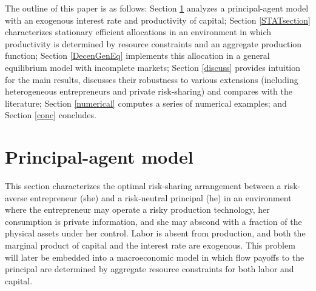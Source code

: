 \documentclass[11pt]{article}
\theoremstyle{plain}
\theoremstyle{definition} %
\begin{document}
The outline of this paper is as follows: Section \ref{PAmodel} analyzes a principal-agent model with an exogenous interest rate and productivity of capital; Section \ref{STATsection} characterizes stationary efficient allocations in an environment in which productivity is determined by resource constraints and an aggregate production function; Section \ref{DecenGenEq} implements this allocation in a general equilibrium model with incomplete markets; Section \ref{discuss} provides intuition for the main results, discusses their robustness to various extensions (including heterogeneous entrepreneurs and private risk-sharing) and compares with the literature; Section \ref{numerical} computes a series of numerical examples; and Section \ref{conc} concludes. 


\section{Principal-agent model} \label{PAmodel}

This section characterizes the optimal risk-sharing arrangement between a risk-averse entrepreneur (she) and a risk-neutral principal (he) in an environment where the entrepreneur may operate a risky production technology, her consumption is private information, and she may abscond with a fraction of the physical assets under her control. Labor is absent from production, and both the marginal product of capital and the interest rate are exogenous. This problem will later be embedded into a macroeconomic model in which flow payoffs to the principal are determined by aggregate resource constraints for both labor and capital. 
\end{document}
